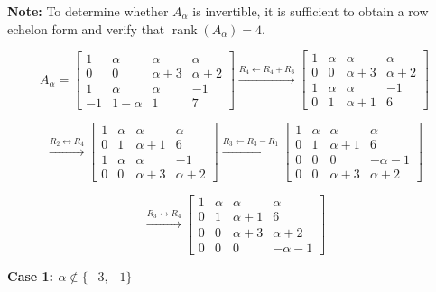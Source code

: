 \begin{answer}
    {\color{red}
        \textbf{Note:} To determine whether $A_\alpha$ is invertible, it is sufficient to obtain
        a row echelon form and verify that $\operatorname{rank}(A_\alpha)=4$.
    }

    $$
    A_\alpha=
    \begin{bmatrix}
        1 & \alpha & \alpha & \alpha\\
        0 & 0 & \alpha+3 & \alpha+2\\
        1 & \alpha & \alpha & -1\\
        -1 & 1-\alpha & 1 & 7
    \end{bmatrix}
    \xrightarrow{R_4\leftarrow R_4+R_3}
    \begin{bmatrix}
        1 & \alpha & \alpha & \alpha\\
        0 & 0 & \alpha+3 & \alpha+2\\
        1 & \alpha & \alpha & -1\\
        0 & 1 & \alpha+1 & 6
    \end{bmatrix}
    $$

    $$
    \xrightarrow{R_2\leftrightarrow R_4}
    \begin{bmatrix}
        1 & \alpha & \alpha & \alpha\\
        0 & 1 & \alpha+1 & 6\\
        1 & \alpha & \alpha & -1\\
        0 & 0 & \alpha+3 & \alpha+2
    \end{bmatrix}
    \xrightarrow{R_3\leftarrow R_3-R_1}
    \begin{bmatrix}
        1 & \alpha & \alpha & \alpha\\
        0 & 1 & \alpha+1 & 6\\
        0 & 0 & 0 & -\alpha-1\\
        0 & 0 & \alpha+3 & \alpha+2
    \end{bmatrix}
    $$

    $$
    \xrightarrow{R_3\leftrightarrow R_4}
    \begin{bmatrix}
        1 & \alpha & \alpha & \alpha\\
        0 & 1 & \alpha+1 & 6\\
        0 & 0 & \alpha+3 & \alpha+2\\
        0 & 0 & 0 & -\alpha-1
    \end{bmatrix}
    $$

    \textbf{Case 1: $\alpha\notin\{-3,-1\}$}


\end{answer}
